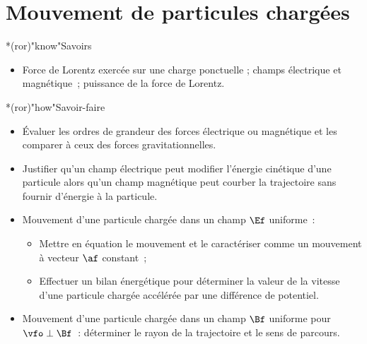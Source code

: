 \documentclass[../../main/main.tex]{subfiles}
\begin{document}
\setcounter{chapter}{4}

\chapter{Mouvement de particules charg\'ees}

\vspace*{\fill}

\begin{prgm}
	\small
	\begin{tcb}*(ror)"know"{Savoirs}
		\begin{itemize}
			\item Force de Lorentz exercée sur une charge
			      ponctuelle ; champs électrique et magnétique~; puissance de la force
			      de Lorentz.
		\end{itemize}
	\end{tcb}
	\begin{tcb}*(ror)"how"{Savoir-faire}
		\begin{itemize}
			\item Évaluer les ordres de grandeur des forces électrique
			      ou magnétique et les comparer à ceux des forces gravitationnelles.
			\item Justifier qu'un champ électrique peut modifier l'énergie cinétique
			      d'une particule alors qu'un champ magnétique peut courber la
			      trajectoire sans fournir d'énergie à la particule.
			\item Mouvement d'une particule chargée dans un champ $\Ef$
			      uniforme~:
			      \begin{itemize}
				      \item Mettre en équation le mouvement et le caractériser comme un
				            mouvement à vecteur $\af$ constant~;
				      \item Effectuer un bilan énergétique pour déterminer la valeur de
				            la vitesse d'une particule chargée accélérée par une
				            différence de potentiel.
			      \end{itemize}
			\item Mouvement d'une particule chargée dans un champ $\Bf$
			      uniforme pour $\vfo \perp \Bf$~: déterminer le rayon de la
			      trajectoire et le sens de parcours.
		\end{itemize}
	\end{tcb}
\end{prgm}

\end{document}
